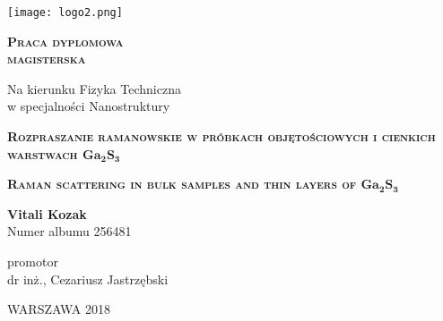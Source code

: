 \begin{titlepage}
	\begin{table}[H]
		\begin{center}
			\texttt{[image: logo2.png]}
		\end{center}
	\end{table}
	
	\vspace{1.0cm}
	\begin{center}
		\textsc{\textbf{\Huge{Praca dyplomowa \\ \vspace{0.5cm} magisterska}}}
	\end{center}
	
	\vspace{1.5cm}
	\begin{center}
		Na kierunku Fizyka Techniczna \\
		w specjalności Nanostruktury
	\end{center}
	
	\vspace{1.0cm}
	\begin{center}
		\textsc{\textbf{\Large{Rozpraszanie ramanowskie w próbkach objętościowych i cienkich warstwach $\mathbf{Ga_{2}S_{3}}$}}}
	\end{center}

	\vspace{0.8cm}
	\begin{center}
		\textsc{\textbf{\Large{Raman scattering in bulk  samples and thin layers of $\mathbf{Ga_{2}S_{3}}$}}}
	\end{center}

	\vspace{2.0cm}
	\begin{center}
		\textbf{\huge{Vitali Kozak}} \\ \vspace{0.3cm} Numer albumu 256481 
	\end{center}

	\vspace{1.5cm}
	\begin{center}
		promotor \\ \vspace{0.3cm} dr inż., Cezariusz Jastrzębski 
	\end{center}
	
	\vspace{1.5cm}
	\begin{center}
		WARSZAWA 2018
	\end{center}
\end{titlepage}
